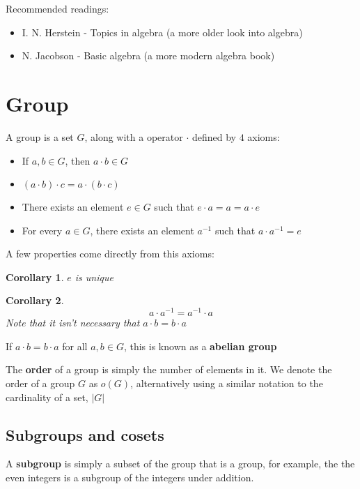\documentclass{report}
\newtheorem{corollary}{Corollary}[theorem]
\begin{document}
Recommended readings:

\begin{itemize}
	\item I. N. Herstein - Topics in algebra (a more older look into algebra)
	\item N. Jacobson - Basic algebra (a more modern algebra book)
\end{itemize}

\section{Group}

A group is a set $G$, along with a operator $\cdot$ defined by $4$ axioms:

\begin{itemize}
	\item If $a,b\in G$, then $a\cdot b\in G$
	\item $(a\cdot b)\cdot c=a\cdot(b\cdot c)$
	\item There exists an element $e\in G$ such that $e\cdot a=a=a\cdot e$
	\item For every $a\in G$, there exists an element $a^{-1}$ such that $a\cdot a^{-1}=e$
\end{itemize}

A few properties come directly from this axioms:

\begin{corollary}
	$e$ is unique
\end{corollary}

\begin{corollary}
	$$a\cdot a^{-1}=a^{-1}\cdot a$$
	Note that it isn't necessary that $a\cdot b=b\cdot a$
\end{corollary}

If $a\cdot b=b\cdot a$ for all $a,b\in G$, this is known as a \textbf{abelian group}

The \textbf{order} of a group is simply the number of elements in it. We denote the order of a group $G$ as $o(G)$, alternatively using a similar notation to the cardinality of a set, $|G|$

\subsection{Subgroups and cosets}

A \textbf{subgroup} is simply a subset of the group that is a group, for example, the the even integers is a subgroup of the integers under addition.
\end{document}
